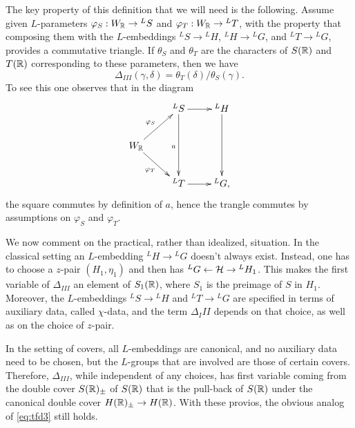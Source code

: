 \documentclass{article}
\theoremstyle{definition}
\numberwithin{equation}{section}
\renewcommand{\-}{\hyp{}}
\begin{document}
The key property of this definition that we will need is the following. Assume given $L$\-parameters $\varphi_S : W_{\mathbb{R}} \to {^LS}$ and $\varphi_T : W_{\mathbb{R}} \to {^LT}$, with the property that composing them with the $L$\-embeddings $^LS \to {^LH}$, $^LH \to {^LG}$, and $^LT \to {^LG}$, provides a commutative triangle. If $\theta_S$ and $\theta_T$ are the characters of $S(\mathbb{R})$ and $T(\mathbb{R})$ corresponding to these parameters, then we have
\begin{equation} \label{eq:tfd3}
\Delta_{III}(\gamma,\delta) = \theta_T(\delta)/\theta_S(\gamma).	
\end{equation}
To see this one observes that in the diagram
\[ \xymatrix{
	&^LS\ar[dd]_a\ar[r]&^LH\ar[dd]\\
	W_\R\ar[ru]^{\varphi_S}\ar[rd]_{\varphi_T}\\
	&^LT\ar[r]&^LG,
}
\]
the square commutes by definition of $a$, hence the trangle commutes by assumptions on $\varphi_S$ and $\varphi_T$.

We now comment on the practical, rather than idealized, situation. In the classical setting an $L$\-embedding $^LH \to {^LG}$ doesn't always exist. Instead, one has to choose a $z$-pair $(H_1,\eta_1)$ and then has $^LG \leftarrow \mathcal{H} \to {^LH_1}$. This makes the first variable of $\Delta_{III}$ an element of $S_1(\mathbb{R})$, where $S_1$ is the preimage of $S$ in $H_1$. Moreover, the $L$\-embeddings $^LS \to {^LH}$ and $^LT \to {^LG}$ are specified in terms of auxiliary data, called $\chi$-data, and the term $\Delta_III$ depends on that choice, as well as on the choice of $z$-pair.

In the setting of covers, all $L$\-embeddings are canonical, and no auxiliary data need to be chosen, but the $L$\-groups that are involved are those of certain covers. Therefore, $\Delta_{III}$, while independent of any choices, has first variable coming from the double cover $S(\mathbb{R})_\pm$ of $S(\mathbb{R})$ that is the pull-back of $S(\mathbb{R})$ under the canonical double cover $H(\mathbb{R})_\pm \to H(\mathbb{R})$. With these provios, the obvious analog of \eqref{eq:tfd3} still holds.
\end{document}
